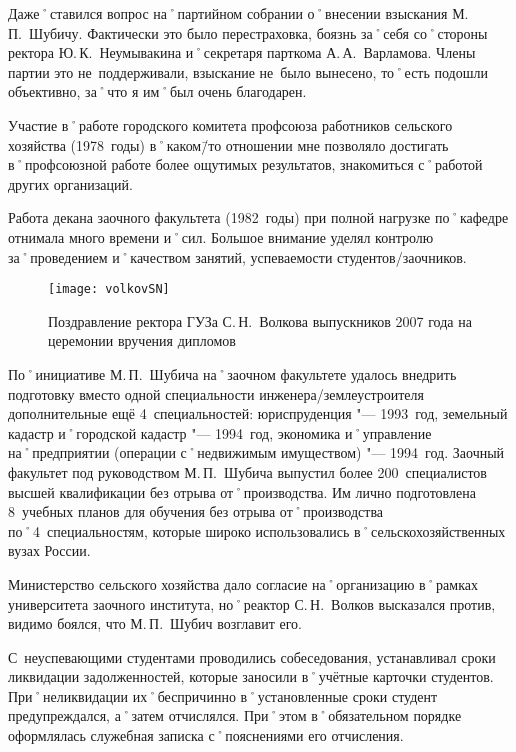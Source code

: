 Даже˚ставился вопрос на˚партийном собрании о˚внесении взыскания М.\,П.~Шубичу. Фактически это было перестраховка, боязнь за˚себя со˚стороны ректора Ю.\,К.~Неумывакина и˚секретаря парткома А.\,А.~Варламова. Члены партии это не~поддерживали, взыскание не~было вынесено, то˚есть подошли объективно, за˚что я им˚был очень благодарен.

Участие в˚работе городского комитета профсоюза работников сельского хозяйства (1978~годы) в˚каком\=/то отношении мне позволяло достигать в˚профсоюзной работе более ощутимых результатов, знакомиться с˚работой других организаций.

Работа декана заочного факультета (1982~годы) при полной нагрузке по˚кафедре отнимала много времени и˚сил. Большое внимание уделял контролю за˚проведением и˚качеством занятий, успеваемости студентов\-/заочников.

\begin{wrapfigure}{O}{.4\textwidth}
\centering
\texttt{[image: volkovSN]}
\caption[Поздравление ректора ГУЗа С.\,Н.~Волкова выпускников 2007 года на церемонии вручения дипломов]{Поздравление ректора ГУЗа С.\,Н.~Волкова выпускников 2007 года на церемонии вручения дипломов\footnotemark}
\label{fig:volkovSN}
\end{wrapfigure}

По˚инициативе М.\,П.~Шубича на˚заочном факультете удалось внедрить подготовку вместо одной специальности инженера\-/землеустроителя дополнительные ещё 4~специальностей: юриспруденция "--- 1993~год, земельный кадастр и˚городской кадастр "--- 1994~год, экономика и˚управление на˚предприятии (операции с˚недвижимым имуществом) "--- 1994~год. Заочный факультет под руководством М.\,П.~Шубича выпустил более 200~специалистов высшей квалификации без отрыва от˚производства. Им лично подготовлена 8~учебных планов для обучения без отрыва от˚производства по˚4~специальностям, которые широко использовались в˚сельскохозяйственных вузах России. 

Министерство сельского хозяйства дало согласие на˚организацию в˚рамках университета заочного института, но˚реактор С.\,Н.~Волков высказался против, видимо боялся, что М.\,П.~Шубич возглавит его.

С~неуспевающими студентами проводились собеседования, устанавливал сроки ликвидации задолженностей, которые заносили в˚учётные карточки студентов. При˚неликвидации их˚беспричинно в˚установленные сроки студент предупреждался, а˚затем отчислялся. При˚этом в˚обязательном порядке оформлялась служебная записка с˚пояснениями его отчисления.

